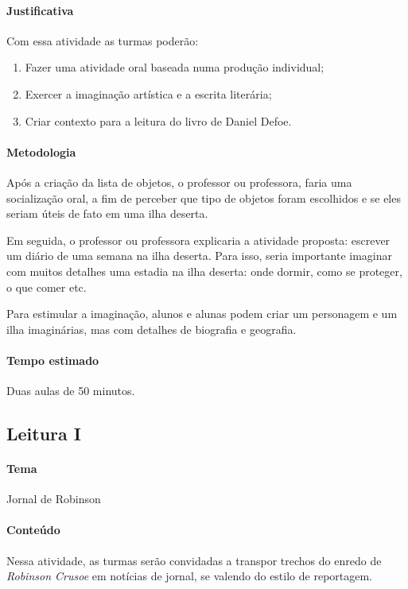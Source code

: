 \documentclass[12pt]{extarticle}
\begin{document}
\paragraph{Justificativa}
Com essa atividade as turmas poderão:

\begin{enumerate}
\item
Fazer uma atividade oral baseada numa produção individual; 

\item
Exercer a imaginação artística e a escrita literária;

\item
Criar contexto para a leitura do livro de Daniel Defoe.
\end{enumerate}

\paragraph{Metodologia}
Após a criação da lista de objetos, o professor ou professora, faria uma
socialização oral, a fim de perceber que tipo de objetos foram
escolhidos e se eles seriam úteis de fato em uma ilha deserta.

Em seguida, o professor ou professora explicaria a atividade proposta:
escrever um diário de uma semana na ilha deserta. Para isso, seria
importante imaginar com muitos detalhes uma estadia na ilha deserta:
onde dormir, como se proteger, o que comer etc.

Para estimular a imaginação, alunos e alunas podem criar um personagem e
um ilha imaginárias, mas com detalhes de biografia e geografia.

\paragraph{Tempo estimado} Duas aulas de 50 minutos.

\subsection{Leitura I}

\paragraph{Tema} Jornal de Robinson


\paragraph{Conteúdo} Nessa atividade, as turmas serão convidadas a transpor trechos do enredo de \emph{Robinson Crusoe} em notícias de jornal, se valendo do estilo de
reportagem.
\end{document}
